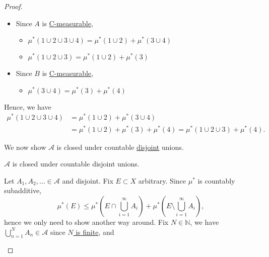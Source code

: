 \begin{proof}
\begin{enumerate}[(a)]
\begin{itemize}
\begin{explanation}
				            \begin{itemize}
					            \item Since \(A\) is \hyperref[def:C-measurable]{C-measurable},
					                  \begin{itemize}
						                  \item \(\mu^{\ast} (1\cup 2\cup 3\cup 4) = \mu^{\ast} (1\cup 2) + \mu^{\ast} (3\cup 4)\)
						                  \item \(\mu^{\ast} (1\cup 2\cup 3) = \mu^{\ast} (1\cup 2) + \mu^{\ast} (3)\)
					                  \end{itemize}
					            \item Since \(B\) is \hyperref[def:C-measurable]{C-measurable},
					                  \begin{itemize}
						                  \item \(\mu^{\ast} (3\cup 4) = \mu^{\ast} (3) + \mu^{\ast} (4)\)
					                  \end{itemize}
				            \end{itemize}
				            Hence, we have
				            \[
					            \begin{split}
						            \mu^{\ast} (1\cup 2\cup 3\cup 4) & = \mu^{\ast} (1\cup 2)+\mu^{\ast} (3\cup 4)              \\
						                                             & = \mu^{\ast} (1\cup 2) + \mu^{\ast} (3) + \mu^{\ast} (4)
						            = \mu^{\ast}(1\cup 2\cup 3) + \mu^{\ast} (4).
					            \end{split}
				            \]
			            \end{explanation}
			            We now show \(\mathcal{A} \) is closed under countable \underline{disjoint} unions.
			            \begin{claim}
				            \(\mathcal{A} \) is closed under countable disjoint unions.
			            \end{claim}
			            \begin{explanation}
				            Let \(A_1, A_2, \dots \in\mathcal{A}\) and disjoint. Fix \(E\subset X\) arbitrary. Since \(\mu^{\ast} \) is countably subadditive,
				            \[
					            \mu^{\ast} (E) \leq  \mu^{\ast} \left(E\cap \bigcup_{i=1}^{\infty} A_{i}\right) + \mu^{\ast} \left(E\setminus \bigcup_{i=1}^{\infty} A_{i}\right),
				            \]
				            hence we only need to show another way around. Fix \(N\in\mathbb{N} \), we have \(\bigcup_{n=1}^{N} A_{n}\in \mathcal{A} \) since \hyperref[pf:Caratheodory-extension-1-finite-unions]{\(N\) is finite}, and

\end{explanation}
\end{itemize}
\end{enumerate}
\end{proof}
